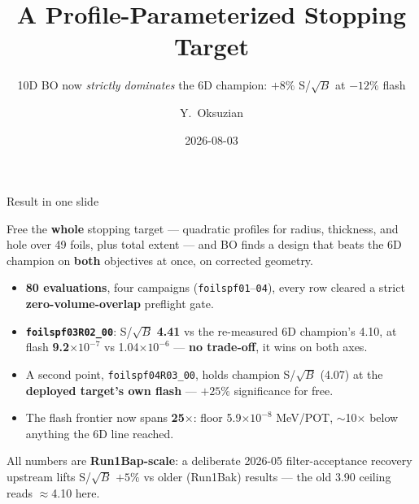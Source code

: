 \documentclass[aspectratio=169,10pt]{beamer}
\title[Profile Stopping Target]{A Profile-Parameterized Stopping Target}
\subtitle{10D BO now \emph{strictly dominates} the 6D champion: $+8\%$ S/$\sqrt{B}$ at $-12\%$ flash}
\author{Y.\ Oksuzian}
\institute[Mu2e autoresearch]{Mu2e --- autoresearch / closed-loop Bayesian optimization}
\date{2026-08-03}
\begin{document}
\begin{frame}
\titlepage
\end{frame}

\begin{frame}{Result in one slide}
\begin{block}{}
Free the \textbf{whole} stopping target --- quadratic profiles for radius, thickness,
and hole over 49 foils, plus total extent --- and BO finds a design that beats the
6D champion on \textbf{both} objectives at once, on corrected geometry.
\end{block}
\vspace{0.5em}
\begin{itemize}
  \item \textbf{80 evaluations}, four campaigns (\texttt{foilspf01}--\texttt{04}), every row
        cleared a strict \textbf{zero-volume-overlap} preflight gate.
  \item \textbf{\texttt{foilspf03R02\_00}}: S/$\sqrt{B}$ \textbf{4.41} vs the
        re-measured 6D champion's 4.10, at flash \textbf{9.2$\times10^{-7}$} vs
        1.04$\times10^{-6}$ --- \textbf{no trade-off}, it wins on both axes.
  \item A second point, \texttt{foilspf04R03\_00}, holds champion S/$\sqrt{B}$ (4.07)
        at the \textbf{deployed target's own flash} --- $+25\%$ significance for free.
  \item The flash frontier now spans \textbf{25$\times$}: floor 5.9$\times10^{-8}$
        MeV/POT, $\sim$10$\times$ below anything the 6D line reached.
\end{itemize}
\vspace{0.3em}
\footnotesize
All numbers are \textbf{Run1Bap-scale}: a deliberate 2026-05 filter-acceptance recovery
upstream lifts S/$\sqrt{B}$ $+5\%$ vs older (Run1Bak) results --- the old 3.90 ceiling
reads $\approx$4.10 here.
\end{frame}
\end{document}
